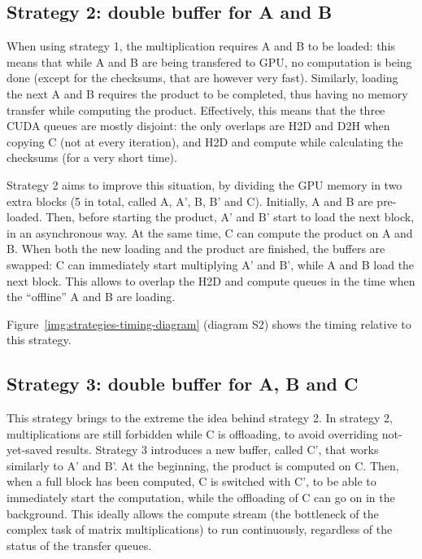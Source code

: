 

\subsection{Strategy 2: double buffer for A and B}

When using strategy 1, the multiplication requires A and B to be loaded: this means that while A and B are being transfered to GPU, no computation is being done (except for the checksums, that are however very fast).
Similarly, loading the next A and B requires the product to be completed, thus having no memory transfer while computing the product.
Effectively, this means that the three CUDA queues are mostly disjoint: the only overlaps are H2D and D2H when copying C (not at every iteration), and H2D and compute while calculating the checksums (for a very short time).

Strategy 2 aims to improve this situation, by dividing the GPU memory in two extra blocks (5 in total, called A, A', B, B' and C).
Initially, A and B are pre-loaded.
Then, before starting the product, A' and B' start to load the next block, in an asynchronous way.
At the same time, C can compute the product on A and B.
When both the new loading and the product are finished, the buffers are swapped: C can immediately start multiplying A' and B', while A and B load the next block.
This allows to overlap the H2D and compute queues in the time when the ``offline'' A and B are loading.

Figure~\ref{img:strategies-timing-diagram} (diagram S2) shows the timing relative to this strategy.


\subsection{Strategy 3: double buffer for A, B and C}

This strategy brings to the extreme the idea behind strategy 2.
In strategy 2, multiplications are still forbidden while C is offloading, to avoid overriding not-yet-saved results.
Strategy 3 introduces a new buffer, called C', that works similarly to A' and B'.
At the beginning, the product is computed on C.
Then, when a full block has been computed, C is switched with C', to be able to immediately start the computation, while the offloading of C can go on in the background.
This ideally allows the compute stream (the bottleneck of the complex task of matrix multiplications) to run continuously, regardless of the status of the transfer queues.

